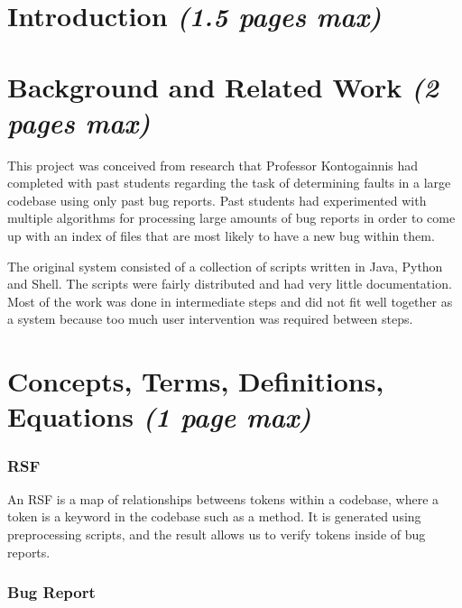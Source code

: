 \documentclass[12pt]{article}
\begin{document}
\section{\texorpdfstring{Introduction \emph{(1.5 pages
max)}}{Introduction (1.5 pages max)}}\label{introduction-1.5-pages-max}

\section{\texorpdfstring{Background and Related Work \emph{(2 pages
max)}}{Background and Related Work (2 pages max)}}\label{background-and-related-work-2-pages-max}

This project was conceived from research that Professor Kontogainnis had
completed with past students regarding the task of determining faults in
a large codebase using only past bug reports. Past students had
experimented with multiple algorithms for processing large amounts of
bug reports in order to come up with an index of files that are most
likely to have a new bug within them.

The original system consisted of a collection of scripts written in
Java, Python and Shell. The scripts were fairly distributed and had very
little documentation. Most of the work was done in intermediate steps
and did not fit well together as a system because too much user
intervention was required between steps.

\section{\texorpdfstring{Concepts, Terms, Definitions, Equations
\emph{(1 page
max)}}{Concepts, Terms, Definitions, Equations (1 page max)}}\label{concepts-terms-definitions-equations-1-page-max}

\subsubsection{RSF}\label{rsf}

An RSF is a map of relationships betweens tokens within a codebase,
where a token is a keyword in the codebase such as a method. It is
generated using preprocessing scripts, and the result allows us to
verify tokens inside of bug reports.

\subsubsection{Bug Report}\label{bug-report}
\end{document}
